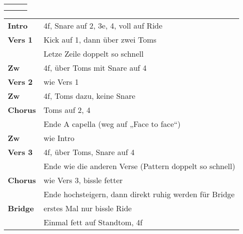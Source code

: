

\begin{tabular}{p{0.6cm}p{12cm}p{1.4cm}}
	\rowcolor{cyan} \myRow{\thesongnumber} & \myRow{Every Step} & \myRow{104} \\
	                                       &                    &             \\
\end{tabular}

\begin{tabular}{p{1.6cm}l}
	\textbf{Intro}  & 4f, Snare auf 2, 3e, 4, voll auf Ride                                    \\
	\textbf{Vers 1} & Kick auf 1, dann über zwei Toms                                          \\
	                & Letze Zeile doppelt so schnell                                           \\
	\textbf{Zw}     & 4f, über Toms mit Snare auf 4                                            \\
	\textbf{Vers 2} & wie Vers 1                                                               \\
	\textbf{Zw}     & 4f, Toms dazu, keine Snare                                               \\
	\textbf{Chorus} & Toms auf 2, 4                                                            \\
	                & Ende A capella (weg auf „Face to face“)                                  \\
	\textbf{Zw}     & wie Intro                                                                \\
	\textbf{Vers 3} & 4f, über Toms, Snare auf 4                                               \\
	                & Ende wie die anderen Verse (Pattern doppelt so schnell)                  \\
	\textbf{Chorus} & wie Vers 3, bissle fetter                                                \\
	                & Ende hochsteigern, dann direkt ruhig werden für Bridge                   \\
	\textbf{Bridge} & erstes Mal nur bissle Ride                                               \\
	                & Einmal fett auf Standtom, 4f                                             \\

\end{tabular}
